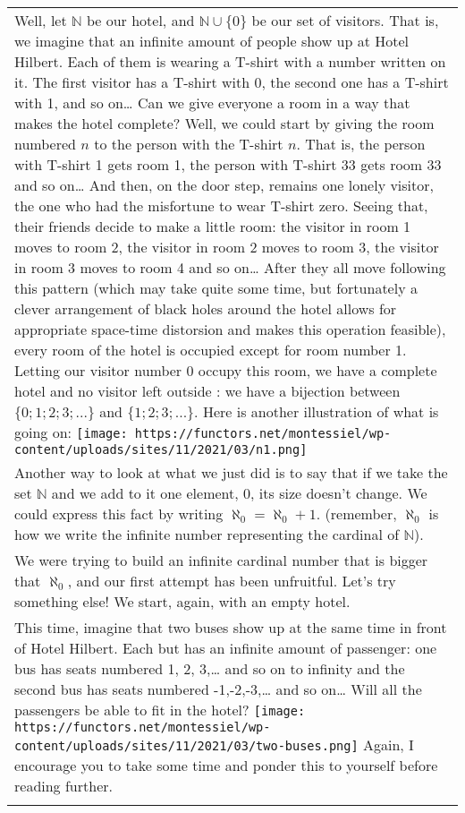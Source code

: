 \documentclass[
]{article}
\begin{document}
\begin{longtable}[]{@{}
  >{\raggedright\arraybackslash}p{}@{}}
\toprule
\endhead
Well, let \(\mathbb{N}\) be our hotel, and \(\mathbb{N} \cup \{0\}\) be
our set of visitors. That is, we imagine that an infinite amount of
people show up at Hotel Hilbert. Each of them is wearing a T-shirt with
a number written on it. The first visitor has a T-shirt with 0, the
second one has a T-shirt with 1, and so on\ldots{} Can we give everyone
a room in a way that makes the hotel complete? Well, we could start by
giving the room numbered \(n\) to the person with the T-shirt \(n\).
That is, the person with T-shirt 1 gets room 1, the person with T-shirt
33 gets room 33 and so on\ldots{} And then, on the door step, remains
one lonely visitor, the one who had the misfortune to wear T-shirt zero.
Seeing that, their friends decide to make a little room: the visitor in
room 1 moves to room 2, the visitor in room 2 moves to room 3, the
visitor in room 3 moves to room 4 and so on\ldots{} After they all move
following this pattern (which may take quite some time, but fortunately
a clever arrangement of black holes around the hotel allows for
appropriate space-time distorsion and makes this operation feasible),
every room of the hotel is occupied except for room number 1. Letting
our visitor number 0 occupy this room, we have a complete hotel and no
visitor left outside : we have a bijection between \(\{0;1;2;3;...\}\)
and \(\{1;2;3;...\}\). Here is another illustration of what is going on:
\texttt{[image: https://functors.net/montessiel/wp-content/uploads/sites/11/2021/03/n1.png]} \\ \addlinespace
Another way to look at what we just did is to say that if we take the
set \(\mathbb{N}\) and we add to it one element, 0, its size doesn't
change. We could express this fact by writing
\(\aleph_0 = \aleph_0 + 1\). (remember, \(\aleph_0\) is how we write the
infinite number representing the cardinal of
\(\mathbb{N}\)). \\ \addlinespace
We were trying to build an infinite cardinal number that is bigger that
\(\aleph_0\), and our first attempt has been unfruitful. Let's try
something else! We start, again, with an empty hotel. \\ \addlinespace
This time, imagine that two buses show up at the same time in front of
Hotel Hilbert. Each but has an infinite amount of passenger: one bus has
seats numbered 1, 2, 3,\ldots{} and so on to infinity and the second bus
has seats numbered -1,-2,-3,\ldots{} and so on\ldots{} Will all the
passengers be able to fit in the hotel?
\texttt{[image: https://functors.net/montessiel/wp-content/uploads/sites/11/2021/03/two-buses.png]}
Again, I encourage you to take some time and ponder this to yourself
before reading further. \\ \addlinespace
\bottomrule
\end{longtable}
\end{document}
